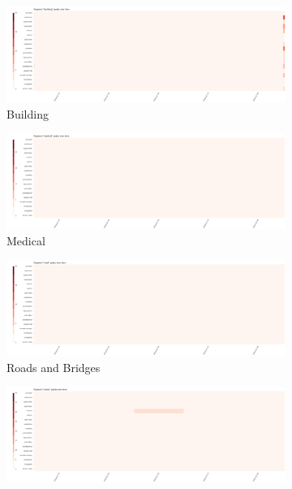 \begin{figure}[!h]
    \centering
    \begin{subfigure}[!h]{0.32\textwidth}
        \centering
        \includegraphics[width=1.00\textwidth]{figs/q1/cond_5h/cond_5h_build.png}
        \caption{Building}
        \label{fig:build_5h}
    \end{subfigure}
    \begin{subfigure}[!h]{0.32\textwidth}
        \centering
        \includegraphics[width=1.00\textwidth]{figs/q1/cond_5h/cond_5h_medical.png}
        \caption{Medical}
        \label{fig:medical_5h}
    \end{subfigure}
    \begin{subfigure}[!h]{0.32\textwidth}
        \centering
        \includegraphics[width=1.00\textwidth]{figs/q1/cond_5h/cond_5h_road.png}
        \caption{Roads and Bridges}
        \label{fig:road_5h}
    \end{subfigure}
    \begin{subfigure}[!h]{0.32\textwidth}
        \centering
        \includegraphics[width=1.00\textwidth]{figs/q1/cond_5h/cond_5h_sewer.png}

\end{subfigure}
\end{figure}

